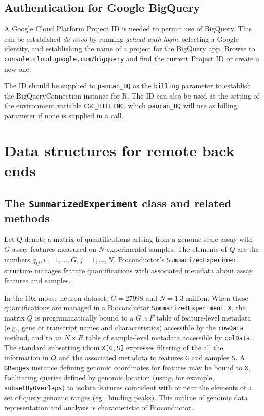\documentclass[applications]{gen-bioinformatics}
\begin{document}
\subsection*{Authentication for Google BigQuery}

A Google Cloud Platform Project ID is needed to
permit use of BigQuery.  This can be established \textit{de novo}
by running \textit{gcloud auth login}, selecting a Google
identity, and establishing the name of a project for
the BigQuery app.  Browse to \texttt{console.cloud.google.com/bigquery}
and find the current Project ID or create a new one.

The ID should be supplied to \verb+pancan_BQ+ as the
\texttt{billing} parameter to establish the BigQueryConnection
instance for R.  The ID can also be used as the setting
of the environment variable \verb+CGC_BILLING+, which
\verb+pancan_BQ+ will use as billing parameter if none
is supplied in a call.


\section*{Data structures for remote back ends}

\subsection*{The \texttt{SummarizedExperiment} class and related methods}

Let $Q$ denote a matrix of quantifications arising from a genome
scale assay with $G$ assay features measured on $N$ experimental
samples.  The elements of $Q$ are the numbers $q_{ij}, i = 1, \ldots, G,
j = 1, \ldots, N$.  Bioconductor's \texttt{SummarizedExperiment} structure
manages feature quantifications
with associated metadata about assay features
and samples.

In the 10x mouse neuron dataset, $G=27998$ and $N=1.3$ million.
When these quantifications are managed in a Bioconductor \texttt{SummarizedExperiment X}, the matrix $Q$ is programmatically bound to a $G \times F$
table of feature-level metadata (e.g., gene or transcript names and
characteristics) accessible by the \texttt{rowData} method, and to an $N \times R$ table of sample-level metadata accessible by \texttt{colData} \citep{Huber2015}. 
The standard subsetting idiom \texttt{X[G,S]} expresses filtering of 
the all the information in $Q$ and the associated metadata
to features \texttt{G} and samples \texttt{S}.  A \texttt{GRanges} 
instance \citep{Lawrence2013} defining genomic coordinates for features may be bound to \texttt{X},
facilitating queries defined by genomic location (using, for example, \texttt{subsetByOverlaps}) to isolate features
coincident with or near the elements of a set of query genomic ranges (eg., binding peaks).  This outline of genomic data representation
and analysis is characteristic of Bioconductor.
\end{document}
